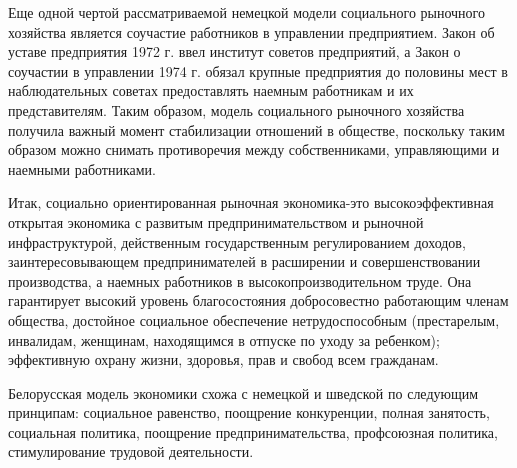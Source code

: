 \documentclass[14pt,a4paper]{article}
\begin{document}
    \par
    Еще одной чертой рассматриваемой немецкой модели социального рыночного хозяйства является соучастие работников в управлении предприятием.
    Закон об уставе предприятия 1972 г. ввел институт советов предприятий, а Закон о соучастии в управлении 1974 г. обязал крупные предприятия до половины мест в наблюдательных советах предоставлять наемным работникам и их представителям.
    Таким образом, модель социального рыночного хозяйства получила важный момент стабилизации отношений в обществе, поскольку таким образом можно снимать противоречия между собственниками, управляющими и наемными работниками.
    \par
    Итак, социально ориентированная рыночная экономика-это высокоэффективная открытая экономика с развитым предпринимательством и рыночной инфраструктурой, действенным государственным регулированием доходов, заинтересовывающем предпринимателей в расширении и совершенствовании производства, а наемных работников в высокопроизводительном труде.
    Она гарантирует высокий уровень благосостояния добросовестно работающим членам общества, достойное социальное обеспечение нетрудоспособным (престарелым, инвалидам, женщинам, находящимся в отпуске по уходу за ребенком); эффективную охрану жизни, здоровья, прав и свобод всем гражданам.
    \par
    Белорусская модель экономики схожа с немецкой и шведской по следующим принципам: социальное равенство, поощрение конкуренции, полная занятость, социальная политика, поощрение предпринимательства, профсоюзная политика, стимулирование трудовой деятельности.
\end{document}
